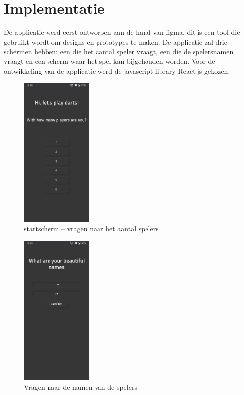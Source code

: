 \section{Implementatie}

	De applicatie werd eerst ontworpen aan de hand van figma, dit is een tool die gebruikt wordt om designs en prototypes te maken. De applicatie zal drie schermen hebben: een die het aantal speler vraagt, een die de spelersnamen vraagt en een scherm waar het spel kan bijgehouden worden. 
	Voor de ontwikkeling van de applicatie werd de javascript library React.js gekozen.
	
	
	\begin{figure}[H]
		\centering
		\includegraphics[width=35mm]{./img/dart1.png}{}
		\caption{startscherm – vragen naar het aantal spelers}
	\end{figure}
	
	\begin{figure}[H]
		\centering
		\includegraphics[width=35mm]{./img/dart2.png}{}
		\caption{Vragen naar de namen van de spelers}
	\end{figure}
	
